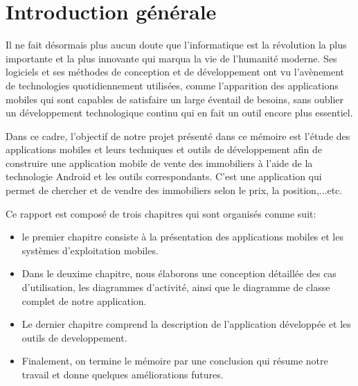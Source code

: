 \documentclass[french,a4,12pt]{report}
\begin{document}
\normalsize{\itshape  }
\newpage
\tableofcontents
\listoffigures
\listoftables


\chapter*{Introduction générale}
\setcounter{page}{1}
\lhead{}
\cfoot{\bfseries \thepage}

Il ne fait désormais plus aucun doute que l'informatique est la révolution la plus importante et la plus innovante qui marqua la vie de l'humanité moderne. Ses logiciels et ses méthodes de conception et de développement ont vu l'avènement de technologies quotidiennement utilisées, comme l'apparition des applications mobiles qui sont capables  de satisfaire  un  large  éventail  de  besoins,  sans  oublier  un  développement  technologique continu qui en fait un outil encore plus essentiel.

Dans ce cadre, l'objectif  de  notre  projet  présenté  dans  ce  mémoire  est  l'étude    des  applications  mobiles  et leurs  techniques  et  outils  de  développement afin de construire  une  application  mobile   de vente des immobiliers à  l’aide  de  la technologie   Android  et  les  outils  correspondants.  C'est  une application qui permet de chercher et de vendre des immobiliers selon le prix, la position,...etc.

Ce rapport est composé de trois chapitres qui sont organisés comme suit:
\begin{itemize}
	\item le premier chapitre consiste à la présentation des applications mobiles et les systèmes d'exploitation mobiles.
	\item Dans le deuxime chapitre,  nous élaborons une conception détaillée des cas d'utilisation, les diagrammes d'activité, ainsi que le diagramme de classe complet de notre application.
	\item Le dernier chapitre comprend la description de l'application développée et les outils de developpement.
	\item Finalement, on termine le mémoire par une conclusion qui résume notre travail et donne quelques améliorations futures.
\end{itemize}
\end{document}
